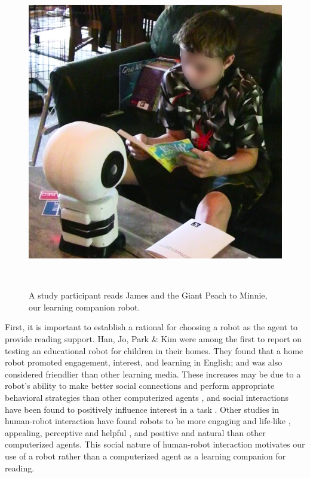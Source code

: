 \documentclass{sigchi}
\begin{document}
\begin{figure}
	\centering
	\includegraphics[width=1\columnwidth]{figures/childWithRobotTeaser_2}
	\caption{A study participant reads James and the Giant Peach to Minnie, our learning companion robot.}~\label{fig:figure1}
\end{figure}

First, it is important to establish a rational for choosing a robot as the agent to provide reading support. Han, Jo, Park \& Kim \cite{Han:2005} were among the first to report on testing an educational robot for children in their homes. They found that a home robot promoted engagement, interest, and learning in English; and was also considered friendlier than other learning media. These increases may be due to a robot's ability to make better social connections and perform appropriate behavioral strategies than other computerized agents \cite{Brown:2013}, and social interactions have been found to positively influence interest in a task \cite{Sansone:2005}. Other studies in human-robot interaction have found robots to be more engaging and life-like \cite{Kiesler:2008}, appealing, perceptive and helpful \cite{Wainer:2007}, and positive and natural \cite{Bainbridge:2011} than other computerized agents. This social nature of human-robot interaction motivates our use of a robot rather than a computerized agent as a learning companion for reading.
\end{document}
